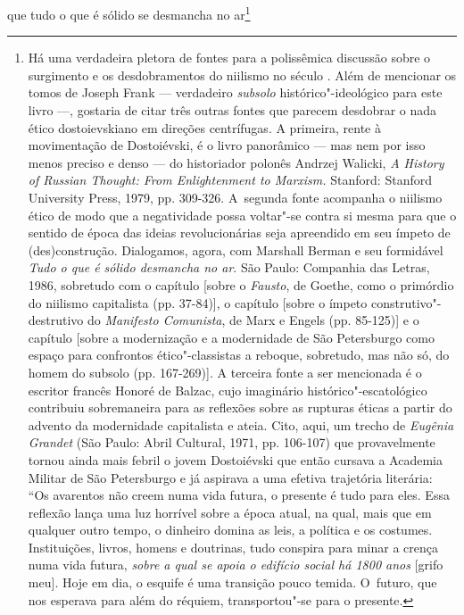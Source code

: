 que tudo o que é sólido se desmancha no ar\footnote{Há uma verdadeira
  pletora de fontes para a polissêmica discussão sobre o surgimento e os
  desdobramentos do niilismo no século . Além de mencionar os tomos
  de Joseph Frank --- verdadeiro \emph{subsolo} histórico"-ideológico para
  este livro ---, gostaria de citar três outras fontes que parecem
  desdobrar o nada ético dostoievskiano em direções centrífugas. A
  primeira, rente à movimentação de Dostoiévski, é o livro panorâmico ---
  mas nem por isso menos preciso e denso --- do historiador polonês
  Andrzej Walicki, \emph{A History of Russian Thought: From
  Enlightenment to Marxism.} Stanford: Stanford University Press, 1979,
  pp. 309-326. A~segunda fonte acompanha o niilismo ético de modo que a
  negatividade possa voltar"-se contra si mesma para que o sentido de
  época das ideias revolucionárias seja apreendido em seu ímpeto de
  (des)construção. Dialogamos, agora, com Marshall Berman e seu
  formidável \emph{Tudo o que é sólido desmancha no ar}. São Paulo:
  Companhia das Letras, 1986, sobretudo com o capítulo  {[}sobre o
  \emph{Fausto}, de Goethe, como o primórdio do niilismo capitalista
  (pp. 37-84){]}, o capítulo  {[}sobre o ímpeto construtivo"-destrutivo
  do \emph{Manifesto Comunista}, de Marx e Engels (pp. 85-125){]} e o
  capítulo  {[}sobre a modernização e a modernidade de São
  Petersburgo como espaço para confrontos ético"-classistas a reboque,
  sobretudo, mas não só, do homem do subsolo (pp. 167-269){]}. A
  terceira fonte a ser mencionada é o escritor francês Honoré de Balzac,
  cujo imaginário histórico"-escatológico contribuiu sobremaneira para as
  reflexões sobre as rupturas éticas a partir do advento da modernidade
  capitalista e ateia. Cito, aqui, um trecho de \emph{Eugênia Grandet}
  (São Paulo: Abril Cultural, 1971, pp. 106-107) que provavelmente
  tornou ainda mais febril o jovem Dostoiévski que então cursava a
  Academia Militar de São Petersburgo e já aspirava a uma efetiva
  trajetória literária: ``Os avarentos não creem numa vida futura, o
  presente é tudo para eles. Essa reflexão lança uma luz horrível sobre
  a época atual, na qual, mais que em qualquer outro tempo, o dinheiro
  domina as leis, a política e os costumes. Instituições, livros, homens
  e doutrinas, tudo conspira para minar a crença numa vida futura,
  \emph{sobre a qual se apoia o edifício social há 1800 anos} {[}grifo
  meu{]}. Hoje em dia, o esquife é uma transição pouco temida. O~futuro,
  que nos esperava para além do réquiem, transportou"-se para o presente.
}
